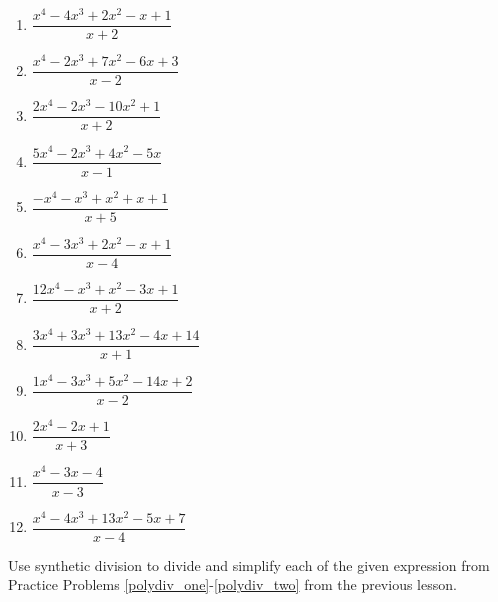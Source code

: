 \documentclass[12pt]{article}
\theoremstyle{definition}
\begin{document}
\begin{multicols}{2}
\begin{enumerate}
  \item $\dfrac{x^4-4x^3+2x^2-x+1 }{x+2}$
  \item $\dfrac{x^4-2x^3+7x^2-6x+3 }{x-2}$
  \item $\dfrac{2x^4-2x^3-10x^2+1 }{x+2}$
  \item $\dfrac{5x^4-2x^3+4x^2-5x }{x-1}$
  \item $\dfrac{-x^4-x^3+x^2+x+1 }{x+5}$
  \item $\dfrac{x^4-3x^3+2x^2-x+1 }{x-4}$
  \item $\dfrac{12x^4-x^3+x^2-3x+1 }{x+2}$
  \item $\dfrac{3x^4+3x^3+13x^2-4x+14 }{x+1}$
  \item $\dfrac{1x^4-3x^3+5x^2-14x+2 }{x-2}$
  \item $\dfrac{2x^4-2x+1 }{x+3}$
  \item $\dfrac{x^4-3x-4 }{x-3}$
  \item $\dfrac{x^4-4x^3+13x^2-5x+7 }{x-4}$
\end{enumerate}
\end{multicols}
Use synthetic division to divide and simplify each of the given expression from Practice Problems 
\ref{polydiv_one}-\ref{polydiv_two} 
from the previous lesson.
\newpage
\end{document}
